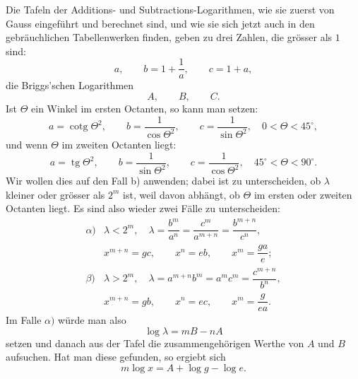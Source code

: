 \documentclass[11pt]{article}
\providecommand{\cotg}{\operatorname{cotg}}
\providecommand{\tg}{\operatorname{tg}}
\begin{document}
Die Tafeln der Additions- und Subtractions-Logarithmen, wie sie zuerst von Gauss eingeführt und berechnet sind, und wie sie sich jetzt auch in den gebräuchlichen Tabellenwerken finden, geben zu drei Zahlen, die grösser als $1$ sind:
\[
        a,\qquad b=1+\frac1a,\qquad c=1+a,
\]
die Briggs'schen Logarithmen
\[
        A,\qquad B,\qquad C.
\]
Ist $\Theta$ ein Winkel im ersten Octanten, so kann man setzen:
\begin{equation}
        a=\cotg\Theta^2,\qquad
        b=\frac1{\cos\Theta^2},\qquad
        c=\frac1{\sin\Theta^2},\quad 0<\Theta<45^\circ,
\tag{3}
\end{equation}
und wenn $\Theta$ im zweiten Octanten liegt:
\begin{equation}
        a=\tg\Theta^2,\qquad
        b=\frac1{\sin\Theta^2},\qquad
        c=\frac1{\cos\Theta^2},\quad 45^\circ<\Theta<90^\circ.
\tag{4}
\end{equation}
Wir wollen dies auf den Fall b) anwenden; dabei ist zu unterscheiden, ob $\lambda$ kleiner oder grösser als $2^m$ ist, weil davon abhängt, ob $\Theta$ im ersten oder zweiten Octanten liegt. Es sind also wieder zwei Fälle zu unterscheiden:
\[
\begin{array}{ll}
\alpha)& \lambda<2^m,\quad
\lambda=\dfrac{b^m}{a^n}=\dfrac{c^m}{a^{m+n}}=\dfrac{b^{m+n}}{c^n},\\[1.0em]
& x^{m+n}=gc,\qquad x^n=eb,\qquad x^m=\dfrac{ga}{e};\\[1.2em]
\beta)& \lambda>2^m,\quad
\lambda=a^{m+n}b^m=a^mc^m=\dfrac{c^{m+n}}{b^n},\\[1.0em]
& x^{m+n}=gb,\qquad x^n=ec,\qquad x^m=\dfrac{g}{ea}.
\end{array}
\tag{5}
\]
Im Falle $\alpha)$ würde man also
\begin{equation}
        \log\lambda=mB-nA
\tag{6}
\end{equation}
setzen und danach aus der Tafel die zusammengehörigen Werthe von $A$ und $B$ aufsuchen. Hat man diese gefunden, so ergiebt sich
\begin{equation}
        m\log x=A+\log g-\log e.
\tag{7}
\end{equation}
\end{document}
